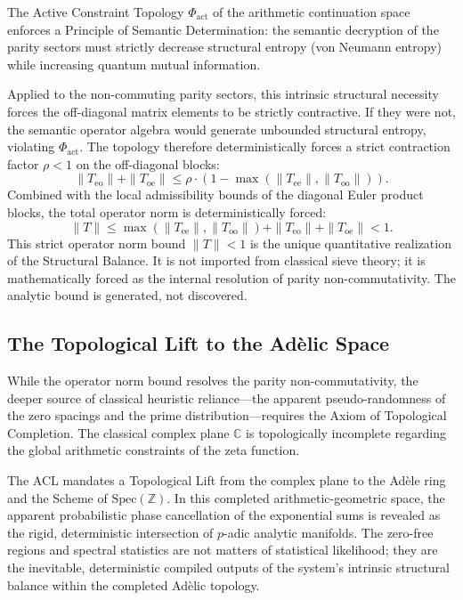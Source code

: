 \documentclass[12pt,openany]{extbook}
\theoremstyle{plain}
\theoremstyle{definition}
\begin{document}
The Active Constraint Topology $\Phi_{\mathrm{act}}$ of the arithmetic continuation space enforces a Principle of Semantic Determination: the semantic decryption of the parity sectors must strictly decrease structural entropy (von Neumann entropy) while increasing quantum mutual information.

Applied to the non-commuting parity sectors, this intrinsic structural necessity forces the off-diagonal matrix elements to be strictly contractive. If they were not, the semantic operator algebra would generate unbounded structural entropy, violating $\Phi_{\mathrm{act}}$. The topology therefore deterministically forces a strict contraction factor $\rho < 1$ on the off-diagonal blocks:
\[
\|T_{\mathrm{eo}}\| + \|T_{\mathrm{oe}}\| \le \rho \cdot \left(1 - \max(\|T_{\mathrm{ee}}\|, \|T_{\mathrm{oo}}\|)\right).
\]
Combined with the local admissibility bounds of the diagonal Euler product blocks, the total operator norm is deterministically forced:
\[
\|T\| \le \max(\|T_{\mathrm{ee}}\|, \|T_{\mathrm{oo}}\|) + \|T_{\mathrm{eo}}\| + \|T_{\mathrm{oe}}\| < 1.
\]
This strict operator norm bound $\|T\| < 1$ is the unique quantitative realization of the Structural Balance. It is not imported from classical sieve theory; it is mathematically forced as the internal resolution of parity non-commutativity. The analytic bound is generated, not discovered.

\subsection{The Topological Lift to the Ad\`elic Space}
While the operator norm bound resolves the parity non-commutativity, the deeper source of classical heuristic reliance---the apparent pseudo-randomness of the zero spacings and the prime distribution---requires the Axiom of Topological Completion. The classical complex plane $\mathbb{C}$ is topologically incomplete regarding the global arithmetic constraints of the zeta function.

The ACL mandates a Topological Lift from the complex plane to the Ad\`ele ring and the Scheme of $\mathrm{Spec}(\mathbb{Z})$. In this completed arithmetic-geometric space, the apparent probabilistic phase cancellation of the exponential sums is revealed as the rigid, deterministic intersection of $p$-adic analytic manifolds. The zero-free regions and spectral statistics are not matters of statistical likelihood; they are the inevitable, deterministic compiled outputs of the system's intrinsic structural balance within the completed Ad\`elic topology.
\end{document}

